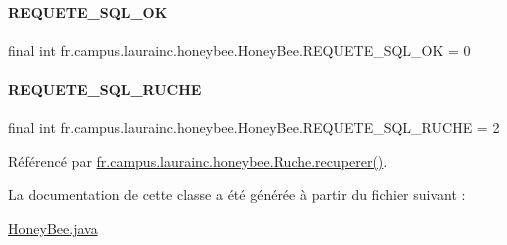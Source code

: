 \paragraph{\texorpdfstring{R\+E\+Q\+U\+E\+T\+E\+\_\+\+S\+Q\+L\+\_\+\+OK}{REQUETE\_SQL\_OK}}
{\footnotesize\ttfamily final int fr.\+campus.\+laurainc.\+honeybee.\+Honey\+Bee.\+R\+E\+Q\+U\+E\+T\+E\+\_\+\+S\+Q\+L\+\_\+\+OK = 0\hspace{0.3cm}{\ttfamily [static]}}

\mbox{\label{classfr_1_1campus_1_1laurainc_1_1honeybee_1_1_honey_bee_a933d238d27d6b17df6f65bef23a2de1d}} 
\paragraph{\texorpdfstring{R\+E\+Q\+U\+E\+T\+E\+\_\+\+S\+Q\+L\+\_\+\+R\+U\+C\+HE}{REQUETE\_SQL\_RUCHE}}
{\footnotesize\ttfamily final int fr.\+campus.\+laurainc.\+honeybee.\+Honey\+Bee.\+R\+E\+Q\+U\+E\+T\+E\+\_\+\+S\+Q\+L\+\_\+\+R\+U\+C\+HE = 2\hspace{0.3cm}{\ttfamily [static]}}



Référencé par \hyperlink{classfr_1_1campus_1_1laurainc_1_1honeybee_1_1_ruche_a7a99d3c585f2c507eb2c6c265a5bb1fe}{fr.\+campus.\+laurainc.\+honeybee.\+Ruche.\+recuperer()}.



La documentation de cette classe a été générée à partir du fichier suivant \+:\begin{DoxyCompactItemize}
\item 
\hyperlink{_honey_bee_8java}{Honey\+Bee.\+java}\end{DoxyCompactItemize}
